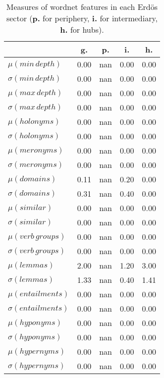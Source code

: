 \begin{table}[h!]
\begin{center}
\begin{tabular}{| l || c | c | c | c |}\hline
 & {\bf g.} & {\bf p.} & {\bf i.} & {\bf h.} \\\hline\hline
$\mu(min\,depth)$ & 0.00  & nan  & 0.00  & 0.00 \\
$\sigma(min\,depth)$ & 0.00  & nan  & 0.00  & 0.00 \\\hline
$\mu(max\,depth)$ & 0.00  & nan  & 0.00  & 0.00 \\
$\sigma(max\,depth)$ & 0.00  & nan  & 0.00  & 0.00 \\\hline
$\mu(holonyms)$ & 0.00  & nan  & 0.00  & 0.00 \\
$\sigma(holonyms)$ & 0.00  & nan  & 0.00  & 0.00 \\\hline
$\mu(meronyms)$ & 0.00  & nan  & 0.00  & 0.00 \\
$\sigma(meronyms)$ & 0.00  & nan  & 0.00  & 0.00 \\\hline
$\mu(domains)$ & 0.11  & nan  & 0.20  & 0.00 \\
$\sigma(domains)$ & 0.31  & nan  & 0.40  & 0.00 \\\hline
$\mu(similar)$ & 0.00  & nan  & 0.00  & 0.00 \\
$\sigma(similar)$ & 0.00  & nan  & 0.00  & 0.00 \\\hline
$\mu(verb\,groups)$ & 0.00  & nan  & 0.00  & 0.00 \\
$\sigma(verb\,groups)$ & 0.00  & nan  & 0.00  & 0.00 \\\hline
$\mu(lemmas)$ & 2.00  & nan  & 1.20  & 3.00 \\
$\sigma(lemmas)$ & 1.33  & nan  & 0.40  & 1.41 \\\hline
$\mu(entailments)$ & 0.00  & nan  & 0.00  & 0.00 \\
$\sigma(entailments)$ & 0.00  & nan  & 0.00  & 0.00 \\\hline
$\mu(hyponyms)$ & 0.00  & nan  & 0.00  & 0.00 \\
$\sigma(hyponyms)$ & 0.00  & nan  & 0.00  & 0.00 \\\hline
$\mu(hypernyms)$ & 0.00  & nan  & 0.00  & 0.00 \\
$\sigma(hypernyms)$ & 0.00  & nan  & 0.00  & 0.00 \\\hline
\end{tabular}
\caption{Measures of wordnet features in each Erd\"os sector ({{\bf p.}} for periphery, {{\bf i.}} for intermediary, {{\bf h.}} for hubs).}
\end{center}
\end{table}